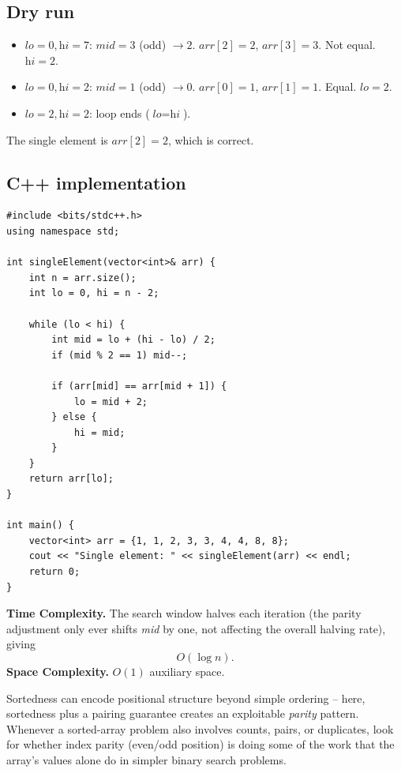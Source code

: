 \subsection*{Dry run}


\begin{itemize}
  \item $\textit{lo}=0,\textit{hi}=7$: $\textit{mid}=3$ (odd) $\to 2$.
        $\textit{arr}[2]=2$, $\textit{arr}[3]=3$. Not equal. $\textit{hi}=2$.
  \item $\textit{lo}=0,\textit{hi}=2$: $\textit{mid}=1$ (odd) $\to 0$.
        $\textit{arr}[0]=1$, $\textit{arr}[1]=1$. Equal. $\textit{lo}=2$.
  \item $\textit{lo}=2,\textit{hi}=2$: loop ends ($\textit{lo}=\textit{hi}$).
\end{itemize}

The single element is $\textit{arr}[2] = 2$, which is correct.

\subsection*{C++ implementation}

\begin{lstlisting}
#include <bits/stdc++.h>
using namespace std;

int singleElement(vector<int>& arr) {
    int n = arr.size();
    int lo = 0, hi = n - 2;

    while (lo < hi) {
        int mid = lo + (hi - lo) / 2;
        if (mid % 2 == 1) mid--;

        if (arr[mid] == arr[mid + 1]) {
            lo = mid + 2;
        } else {
            hi = mid;
        }
    }
    return arr[lo];
}

int main() {
    vector<int> arr = {1, 1, 2, 3, 3, 4, 4, 8, 8};
    cout << "Single element: " << singleElement(arr) << endl;
    return 0;
}
\end{lstlisting}

\begin{complexitybox}
\textbf{Time Complexity.} The search window halves each iteration (the
parity adjustment only ever shifts \textit{mid} by one, not affecting the
overall halving rate), giving
\[
  O(\log n).
\]
\textbf{Space Complexity.} $O(1)$ auxiliary space.
\end{complexitybox}

\begin{takeawaybox}
Sortedness can encode positional structure beyond simple ordering --
here, sortedness plus a pairing guarantee creates an exploitable
\emph{parity} pattern. Whenever a sorted-array problem also involves
counts, pairs, or duplicates, look for whether index parity (even/odd
position) is doing some of the work that the array's values alone do in
simpler binary search problems.
\end{takeawaybox}

